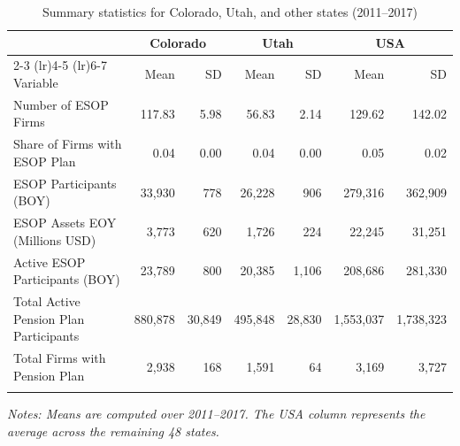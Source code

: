 \begin{table}[H]
\begin{center}
\caption{Summary statistics for Colorado, Utah, and other states (2011--2017)}
\label{fig:summary_stats}

\begin{tabular}{lrrrrrr}
\toprule
& \multicolumn{2}{c}{Colorado} & \multicolumn{2}{c}{Utah} & \multicolumn{2}{c}{USA} \\
\cmidrule(lr){2-3} \cmidrule(lr){4-5} \cmidrule(lr){6-7}
Variable & Mean & SD & Mean & SD & Mean & SD \\
\midrule
\addlinespace[0.5em]
Number of ESOP Firms & 117.83 & 5.98 & 56.83 & 2.14 & 129.62 & 142.02 \\
\addlinespace[0.5em]
Share of Firms with ESOP Plan & 0.04 & 0.00 & 0.04 & 0.00 & 0.05 & 0.02 \\
\addlinespace[0.5em]
ESOP Participants (BOY) & 33,930 & 778 & 26,228 & 906 & 279,316 & 362,909 \\
\addlinespace[0.5em]
ESOP Assets EOY (Millions USD) & 3,773 & 620 & 1,726 & 224 & 22,245 & 31,251 \\
\addlinespace[0.5em]
Active ESOP Participants (BOY) & 23,789 & 800 & 20,385 & 1,106 & 208,686 & 281,330 \\
\addlinespace[0.5em]
Total Active Pension Plan Participants & 880,878 & 30,849 & 495,848 & 28,830 & 1,553,037 & 1,738,323 \\
\addlinespace[0.5em]
Total Firms with Pension Plan & 2,938 & 168 & 1,591 & 64 & 3,169 & 3,727 \\
\addlinespace[0.5em]
\bottomrule
\end{tabular}

\vspace{0.5em}
{\small \textit{Notes: Means are computed over 2011--2017. The USA column represents the average across the remaining 48 states.}}

\end{center}
\end{table}
